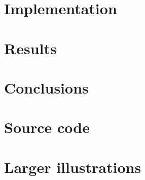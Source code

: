 \documentclass[12pt,a4paper]{report}
\begin{document}
\chapter{Implementation}
    
    \newpage
\chapter{Results}
    
    \newpage
\chapter{Conclusions}
    


\newpage
\renewcommand{\bibname}{\hspace{42pt}References} 
 


\appendix
\begin{appendices}
\chapter{Source code}
    
\chapter{Larger illustrations}
\end{appendices}
\end{document}

